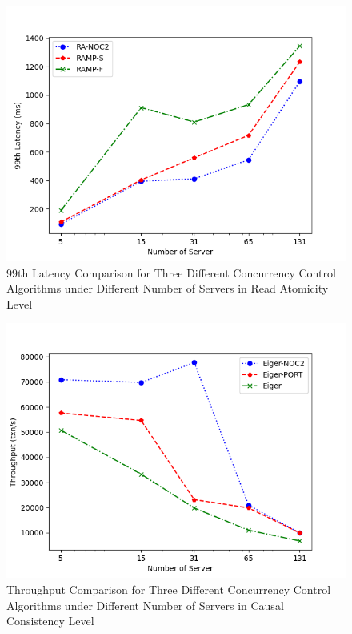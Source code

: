 \begin{figure}[H]
    \centering
    \includegraphics[width=0.8\linewidth]{figure/3-ra-l.png}
    \caption{99th Latency Comparison for Three Different Concurrency Control Algorithms under Different Number of Servers in Read Atomicity Level}
    \label{fig:9}
\end{figure}


\begin{figure}[H]
    \centering
    \includegraphics[width=0.8\linewidth]{figure/3-tcc-t.png}
    \caption{Throughput Comparison for Three Different Concurrency Control Algorithms under Different Number of Servers in Causal Consistency Level}
    \label{fig:10}
\end{figure}


